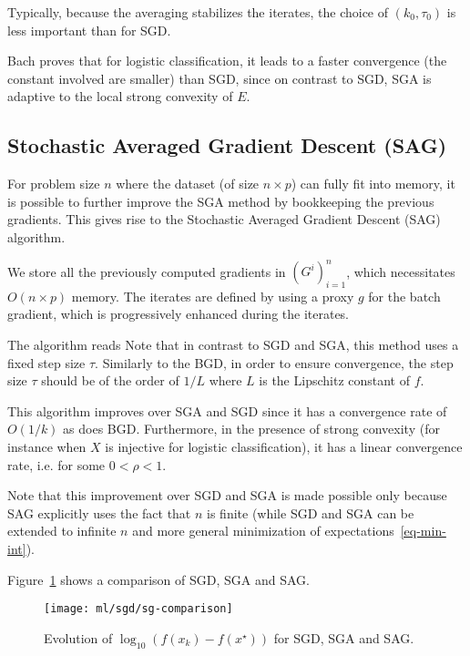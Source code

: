 Typically, because the averaging stabilizes the iterates, the choice of
$(k_0,\tau_0)$ is less important than for SGD. 


Bach proves that for logistic classification, 
it leads to a faster convergence (the constant involved are
smaller) than SGD, since 
on contrast to SGD, SGA is adaptive to the local strong convexity of $E$.



\subsection{Stochastic Averaged Gradient Descent (SAG)}

For problem size $n$ where the dataset (of size $n \times p$) can
fully fit into memory, it is possible to further improve the SGA method
by bookkeeping the previous gradients. This gives rise to the 
Stochastic Averaged Gradient Descent (SAG) algorithm.

We store all the previously computed gradients in $(G^i)_{i=1}^n$,
which necessitates $O(n \times p)$ memory. 
The iterates are defined by using a proxy $g$ for the batch gradient,
which is progressively enhanced during the iterates.

The algorithm reads
Note that in contrast to SGD and SGA, this method uses a fixed step
size $\tau$. Similarly to the BGD, in order to ensure convergence, 
the step size $\tau$ should be of the order of $1/L$
where $L$ is the Lipschitz constant of $f$.

This algorithm improves over SGA and SGD
since it has a convergence rate of $O(1/k)$ as does BGD. 
Furthermore, in the presence of strong convexity (for instance when $X$ is
injective for logistic classification), it has a linear convergence rate, 
i.e. 
for some $0 < \rho < 1$. 

Note that this improvement over SGD and SGA is made possible only because
SAG explicitly uses the fact that $n$ is finite (while SGD and SGA can
be extended to infinite $n$ and more general minimization of
expectations~\eqref{eq-min-int}).

Figure~\ref{fig-compariso-sgd} shows a comparison of SGD, SGA and SAG.

\begin{figure}
\centering
\texttt{[image: ml/sgd/sg-comparison]}
\caption{\label{fig-compariso-sgd}
Evolution of $\log_{10}(f(x_k)-f(x^\star))$ for SGD, SGA and SAG.
}
\end{figure}



